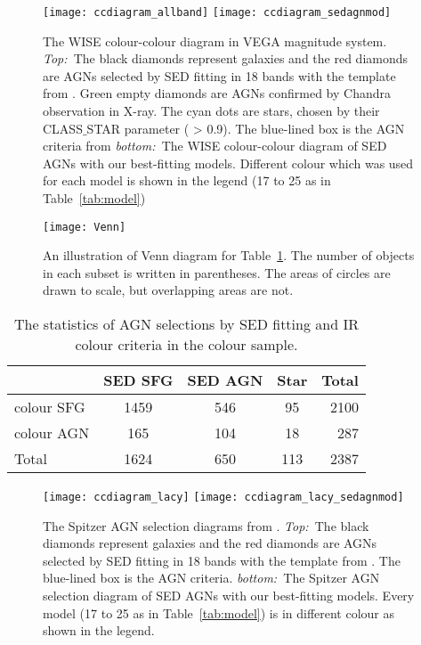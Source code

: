 \documentclass[a4paper,fleqn,usenatbib]{mnras}
\begin{document}
\begin{figure}
	\texttt{[image: ccdiagram\_allband]}	
	\texttt{[image: ccdiagram\_sedagnmod]}
    \caption{The WISE colour-colour diagram in VEGA magnitude system. \textsl{Top:~}The black diamonds represent galaxies and the red diamonds are AGNs selected by SED fitting in 18 bands with the template from \citet{Polletta et al. 2007}. Green empty diamonds are AGNs confirmed by Chandra observation in X-ray. The cyan dots are stars, chosen by their CLASS$\_$STAR parameter ( > 0.9). The blue-lined box is the AGN criteria from \citet{Jarrett et al. 2011} \textsl{bottom:~}The WISE colour-colour diagram of SED AGNs with our best-fitting models. Different colour which was used for each model is shown in the legend (17 to 25 as in Table~\ref{tab:model})}
    \label{fig:ccdiagram}
\end{figure}    

\begin{figure}
	\texttt{[image: Venn]}
    \caption{An illustration of Venn diagram for Table~\ref{tab:18-band}. The number of objects in each subset is written in parentheses. The areas of circles are drawn to scale, but overlapping areas are not.}
    \label{fig:Venn}
\end{figure}

\begin{table}
	\centering
	\caption{The statistics of AGN selections by SED fitting and IR colour criteria in the colour sample.}
	\label{tab:18-band}
	\begin{tabular}{lcccr} %
		\hline
		 & SED SFG & SED AGN & Star & Total\\
		\hline
		colour SFG & 1459 & 546 & 95 & 2100\\
		colour AGN & 165 & 104 & 18 & 287\\
		Total & 1624 & 650 & 113 & 2387\\
		\hline
	\end{tabular}
\end{table}
    
\begin{figure}
	\texttt{[image: ccdiagram\_lacy]}	
	\texttt{[image: ccdiagram\_lacy\_sedagnmod]}
    \caption{The Spitzer AGN selection diagrams from \citet{Lacy et al. 2007}. \textsl{Top:~}The black diamonds represent galaxies and the red diamonds are AGNs selected by SED fitting in 18 bands with the template from \citet{Polletta et al. 2007}. The blue-lined box is the AGN criteria. \textsl{bottom:~}The Spitzer AGN selection diagram of SED AGNs with our best-fitting models. Every model (17 to 25 as in Table~\ref{tab:model}) is in different colour as shown in the legend.}        
    \label{fig:ccdiagram_lacy}
\end{figure}
\end{document}
